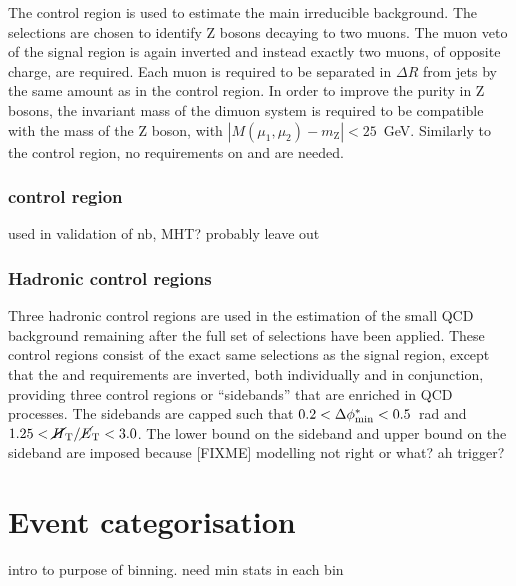 The \mmj control region is used to estimate the main irreducible \znnj 
background. The selections are chosen to identify Z bosons decaying to two 
muons. The muon veto of the signal region is again inverted and instead exactly 
two muons, of opposite charge, are required. Each muon is required to be 
separated in $\Delta R$ from jets by the same amount as in the \mj control 
region. In order to improve the purity in Z bosons, the invariant mass of the 
dimuon system is required to be compatible with the mass of the Z boson, with 
$|M(\mu_1,\mu_2) - m_\mathrm{Z}| < 25$~GeV. Similarly to the \mj control 
region, no requirements on \alphat and \bdphi are needed.


\subsubsection{\gj control region}
used in validation of nb, MHT?
probably leave out

\subsubsection{Hadronic control regions}

Three hadronic control regions are used in the estimation of the small QCD 
background remaining after the full set of selections have been applied. These 
control regions consist of the exact same selections as the signal region, 
except that the \bdphi and \mhtmet requirements are inverted, both individually 
and in conjunction, providing three control regions or ``sidebands'' that are 
enriched in QCD processes. The sidebands are capped such that 
$0.2<\mbox{$\Delta\phi^{*}_{\mathrm{min}}$}<0.5$~rad and $1.25<\mbox{$\mbox{$\cancel{H}_\text{T}$} / \mbox{$\cancel{E}_\text{T}$}$}<3.0$. The lower bound on the \bdphi 
sideband and upper bound on the \mhtmet sideband are imposed because [FIXME] 
modelling not right or what? ah trigger?

\section{Event categorisation}



intro to purpose of binning.
need min stats in each bin

